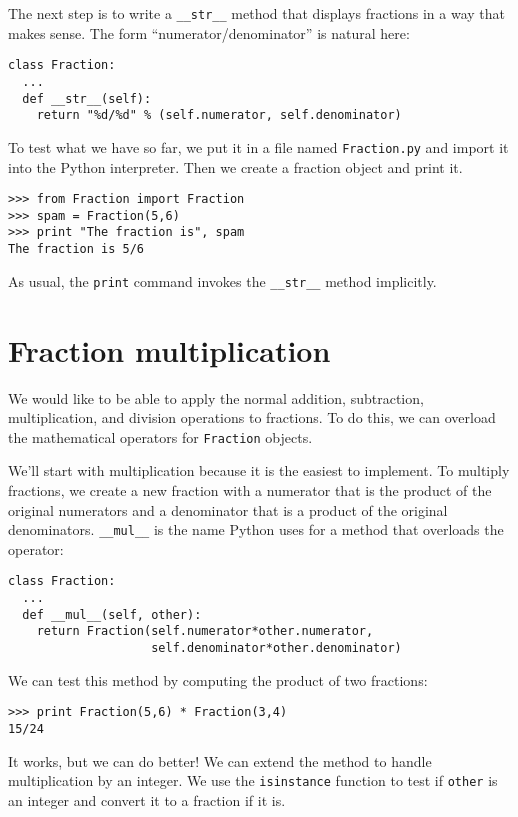 The next step is to write a {\tt \_\_str\_\_} method that
displays fractions in a way that makes sense.  The form
``numerator/denominator'' is natural here:

\beforeverb
\begin{verbatim}
class Fraction:
  ...
  def __str__(self):
    return "%d/%d" % (self.numerator, self.denominator)
\end{verbatim}
\afterverb
%
To test what we have so far, we put it in a file named
{\tt Fraction.py} and import it into the Python interpreter.
Then we create a fraction object and print it.

\beforeverb
\begin{verbatim}
>>> from Fraction import Fraction
>>> spam = Fraction(5,6)
>>> print "The fraction is", spam
The fraction is 5/6
\end{verbatim}
\afterverb
%
As usual, the {\tt print} command invokes the {\tt \_\_str\_\_}
method implicitly.


\section {Fraction multiplication}

We would like to be able to apply the normal addition, subtraction,
multiplication, and division operations to fractions.  To do this, we
can overload the mathematical operators for {\tt Fraction} objects.


We'll start with multiplication because it is the easiest to implement.
To multiply fractions, we create a new fraction with a numerator
that is the product of the original numerators and a denominator that
is a product of the original denominators.  {\tt \_\_mul\_\_} is the
name Python uses for a method that overloads the {\tt *} operator:

\beforeverb
\begin{verbatim}
class Fraction:
  ...
  def __mul__(self, other):
    return Fraction(self.numerator*other.numerator,
                    self.denominator*other.denominator)
\end{verbatim}
\afterverb
%
We can test this method by computing the product of two fractions:

\beforeverb
\begin{verbatim}
>>> print Fraction(5,6) * Fraction(3,4)
15/24
\end{verbatim}
\afterverb
%
It works, but we can do better!  We can extend the method to
handle multiplication by an integer.  We use the {\tt isinstance} function
to test if {\tt other} is an integer and convert it to a fraction if
it is.

